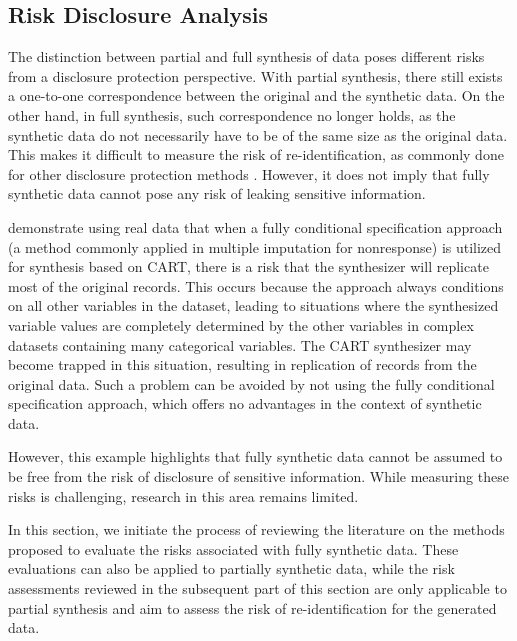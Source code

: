 \subsection{Risk Disclosure Analysis}
\label{subsec:risk}
The distinction between partial and full synthesis of data poses different risks from a disclosure protection perspective. With partial synthesis, there still exists a one-to-one correspondence between the original and the synthetic data. On the other hand, in full synthesis, such correspondence no longer holds, as the synthetic data do not necessarily have to be of the same size as the original data. This makes it difficult to measure the risk of re-identification, as commonly done for other disclosure protection methods \citep{reiter2005estimating, skinner2008assessing, shlomo2014probabilistic}. However, it does not imply that fully synthetic data cannot pose any risk of leaking sensitive information.

\citet{manrique2018bayesian} demonstrate using real data that when a fully conditional specification approach (a method commonly applied in multiple imputation for nonresponse) is utilized for synthesis based on CART, there is a risk that the synthesizer will replicate most of the original records. This occurs because the approach always conditions on all other variables in the dataset, leading to situations where the synthesized variable values are completely determined by the other variables in complex datasets containing many categorical variables. The CART synthesizer may become trapped in this situation, resulting in replication of records from the original data. Such a problem can be avoided by not using the fully conditional specification approach, which offers no advantages in the context of synthetic data.

However, this example highlights that fully synthetic data cannot be assumed to be free from the risk of disclosure of sensitive information. While measuring these risks is challenging, research in this area remains limited.

In this section, we initiate the process of reviewing the literature on the methods proposed to evaluate the risks associated with fully synthetic data. These evaluations can also be applied to partially synthetic data, while the risk assessments reviewed in the subsequent part of this section are only applicable to partial synthesis and aim to assess the risk of re-identification for the generated data.


